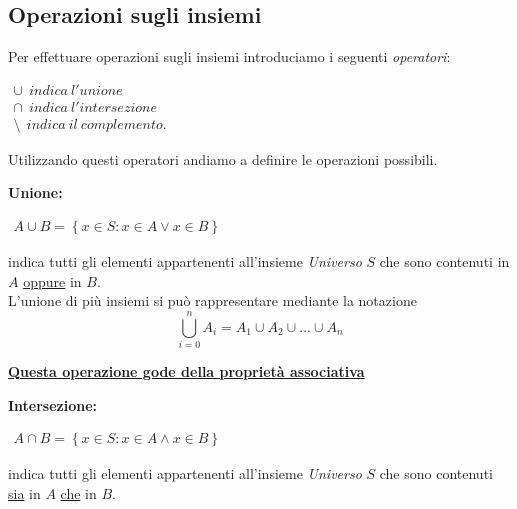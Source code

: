 \documentclass[a4paper]{article}
\newcommand{\nid}{\newline \par}
\begin{document}
\subsection{Operazioni sugli insiemi}
Per effettuare operazioni sugli insiemi introduciamo i seguenti \textit{operatori}:
 \begin{center}
	\begin{math}
		\begin{array}{l}
			\cup \ \ indica \ l'unione \\
			\cap \ \ indica \ l'intersezione\\
			\setminus \ \ indica \ il \ complemento.
			
		\end{array}
	\end{math}
\end{center}
Utilizzando questi operatori andiamo a definire le operazioni possibili.
\nid
\textbf{Unione: }

 \begin{center}
	\begin{math}
		\begin{array}{l}
			A\cup B = \left\lbrace x \in S:x\in A \lor x \in B \right\rbrace 
		\end{array}
	\end{math}
\end{center}

indica tutti gli elementi appartenenti all'insieme \textit{Universo} $S$ che sono contenuti in $A$ \underline{oppure} in $B$. \\

L'unione di più insiemi si può rappresentare mediante la notazione
\begin{equation*}
	\bigcup_{i=0}^n A_i = A_1 \cup A_2 \cup ... \cup A_n
\end{equation*}

\underline{\textbf{Questa operazione gode della proprietà associativa}}
\nid
\textbf{Intersezione: }

\begin{center}
	\begin{math}
		\begin{array}{l}
			A\cap B = \left\lbrace x \in S:x\in A \wedge x \in B \right\rbrace 
		\end{array}
	\end{math}
\end{center}

indica tutti gli elementi appartenenti all'insieme \textit{Universo} $S$ che sono contenuti \underline{sia} in $A$ \underline{che} in $B$.\\
\end{document}
